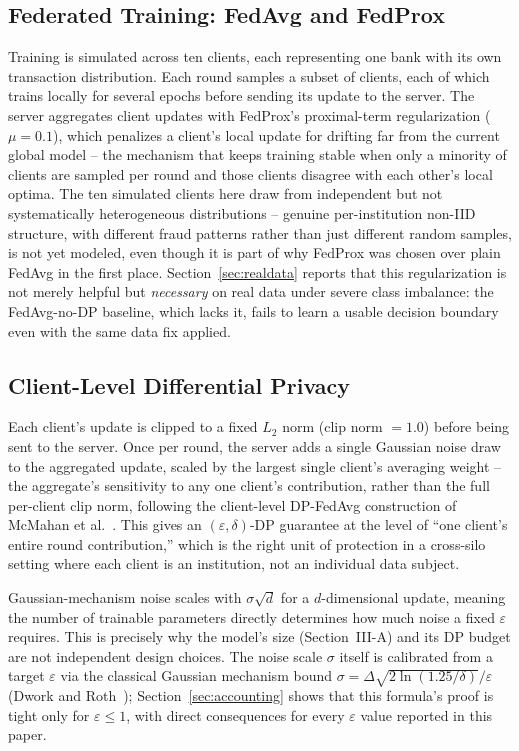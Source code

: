 \documentclass[12pt]{svproc}
\begin{document}
\subsection{Federated Training: FedAvg and FedProx}
Training is simulated across ten clients, each representing one bank
with its own transaction distribution. Each round samples a subset of
clients, each of which trains locally for several epochs before sending
its update to the server. The server aggregates client updates with
FedProx's proximal-term regularization ($\mu=0.1$), which penalizes a
client's local update for drifting far from the current global model --
the mechanism that keeps training stable when only a minority of
clients are sampled per round and those clients disagree with each
other's local optima. The ten simulated clients here draw from
independent but not systematically heterogeneous distributions --
genuine per-institution non-IID structure, with different fraud
patterns rather than just different random samples, is not yet modeled,
even though it is part of why FedProx was chosen over plain FedAvg in
the first place. Section~\ref{sec:realdata} reports that this
regularization is not merely helpful but \emph{necessary} on real data
under severe class imbalance: the FedAvg-no-DP baseline, which lacks it,
fails to learn a usable decision boundary even with the same data fix
applied.

\subsection{Client-Level Differential Privacy}
\label{sec:dp-mechanism}
Each client's update is clipped to a fixed $L_2$ norm (clip norm
$=1.0$) before being sent to the server. Once per round, the server adds
a single Gaussian noise draw to the aggregated update, scaled by the
largest single client's averaging weight -- the aggregate's sensitivity
to any one client's contribution, rather than the full per-client clip
norm, following the client-level DP-FedAvg construction of McMahan et
al.~\cite{mcmahan2018dp}. This gives an $(\varepsilon,\delta)$-DP
guarantee at the level of ``one client's entire round contribution,''
which is the right unit of protection in a cross-silo setting where each
client is an institution, not an individual data subject.

Gaussian-mechanism noise scales with $\sigma\sqrt{d}$ for a
$d$-dimensional update, meaning the number of trainable parameters
directly determines how much noise a fixed $\varepsilon$ requires. This
is precisely why the model's size (Section~III-A) and its DP budget are
not independent design choices. The noise scale $\sigma$ itself is
calibrated from a target $\varepsilon$ via the classical Gaussian
mechanism bound $\sigma = \Delta\sqrt{2\ln(1.25/\delta)}/\varepsilon$
(Dwork and Roth~\cite{dwork2014dp}); Section~\ref{sec:accounting} shows
that this formula's proof is tight only for $\varepsilon \le 1$, with
direct consequences for every $\varepsilon$ value reported in this
paper.
\end{document}
